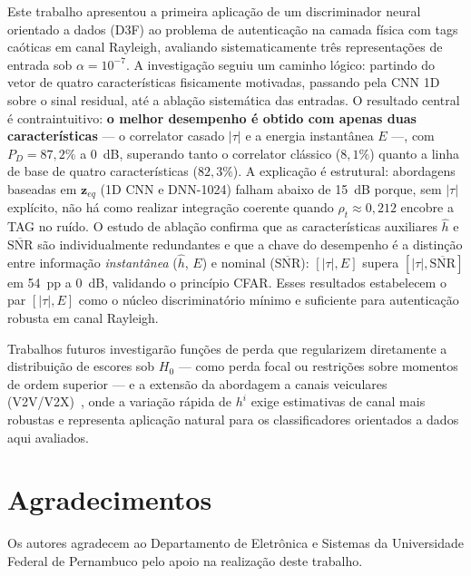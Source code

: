 \documentclass{sbrt}
\begin{document}
Este trabalho apresentou a primeira aplicação de um discriminador neural orientado a dados (D3F) ao problema de autenticação na camada física com tags caóticas em canal Rayleigh, avaliando sistematicamente três representações de entrada sob $\alpha = 10^{-7}$. A investigação seguiu um caminho lógico: partindo do vetor de quatro características fisicamente motivadas, passando pela CNN 1D sobre o sinal residual, até a ablação sistemática das entradas. O resultado central é contraintuitivo: \textbf{o melhor desempenho é obtido com apenas duas características} — o correlator casado $|\tau|$ e a energia instantânea $E$ —, com $P_D = 87{,}2\%$ a 0~dB, superando tanto o correlator clássico ($8{,}1\%$) quanto a linha de base de quatro características ($82{,}3\%$). A explicação é estrutural: abordagens baseadas em $\mathbf{z}_{eq}$ (1D CNN e DNN-1024) falham abaixo de 15~dB porque, sem $|\tau|$ explícito, não há como realizar integração coerente quando $\rho_t \approx 0{,}212$ encobre a TAG no ruído. O estudo de ablação confirma que as características auxiliares $\hat{h}$ e $\overline{\text{SNR}}$ são individualmente redundantes e que a chave do desempenho é a distinção entre informação \emph{instantânea} ($\hat{h}$, $E$) e nominal ($\overline{\text{SNR}}$): $[|\tau|, E]$ supera $[|\tau|, \overline{\text{SNR}}]$ em 54~pp a 0~dB, validando o princípio CFAR. Esses resultados estabelecem o par $[|\tau|, E]$ como o núcleo discriminatório mínimo e suficiente para autenticação robusta em canal Rayleigh.

Trabalhos futuros investigarão funções de perda que regularizem diretamente a distribuição de escores sob $H_0$ — como perda focal ou restrições sobre momentos de ordem superior — e a extensão da abordagem a canais veiculares (V2V/V2X)~\cite{ref_3gpp}, onde a variação rápida de $h^i$ exige estimativas de canal mais robustas e representa aplicação natural para os classificadores orientados a dados aqui avaliados.

\section*{Agradecimentos}
Os autores agradecem ao Departamento de Eletrônica e Sistemas da Universidade Federal de Pernambuco pelo apoio na realização deste trabalho.
\end{document}
